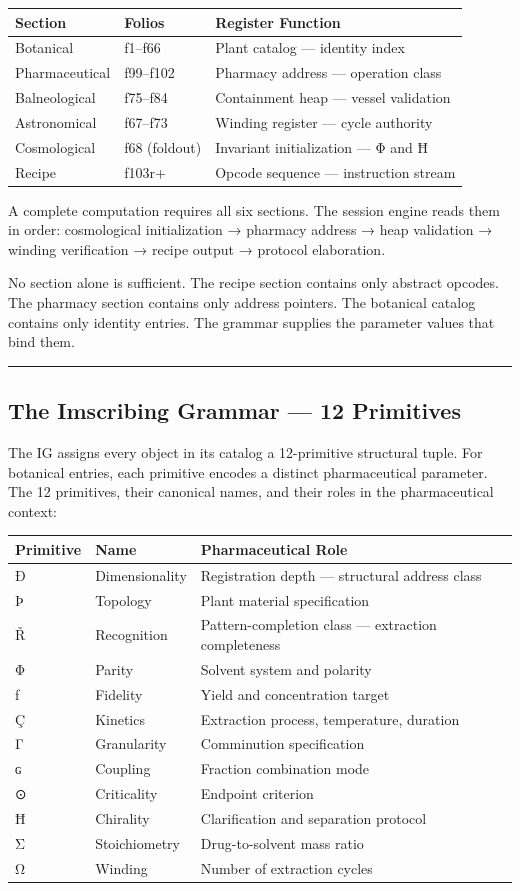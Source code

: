 \documentclass[12pt,a4paper]{article}
\begin{document}
\begin{longtable}[]{@{}lll@{}}
\toprule
Section & Folios & Register Function\tabularnewline
\midrule
\endhead
Botanical & f1--f66 & Plant catalog --- identity index\tabularnewline
Pharmaceutical & f99--f102 & Pharmacy address --- operation
class\tabularnewline
Balneological & f75--f84 & Containment heap --- vessel
validation\tabularnewline
Astronomical & f67--f73 & Winding register --- cycle
authority\tabularnewline
Cosmological & f68 (foldout) & Invariant initialization --- Φ and
Ħ\tabularnewline
Recipe & f103r+ & Opcode sequence --- instruction stream\tabularnewline
\bottomrule
\end{longtable}

A complete computation requires all six sections. The session engine
reads them in order: cosmological initialization → pharmacy address →
heap validation → winding verification → recipe output → protocol
elaboration.

No section alone is sufficient. The recipe section contains only
abstract opcodes. The pharmacy section contains only address pointers.
The botanical catalog contains only identity entries. The grammar
supplies the parameter values that bind them.

\begin{center}\rule{0.5\linewidth}{0.5pt}\end{center}

\hypertarget{the-imscribing-grammar-12-primitives}{%
\subsection{The Imscribing Grammar --- 12
Primitives}\label{the-imscribing-grammar-12-primitives}}

The IG assigns every object in its catalog a 12-primitive structural
tuple. For botanical entries, each primitive encodes a distinct
pharmaceutical parameter. The 12 primitives, their canonical names, and
their roles in the pharmaceutical context:

\begin{longtable}[]{@{}lll@{}}
\toprule
Primitive & Name & Pharmaceutical Role\tabularnewline
\midrule
\endhead
Ð & Dimensionality & Registration depth --- structural address
class\tabularnewline
Þ & Topology & Plant material specification\tabularnewline
Ř & Recognition & Pattern-completion class --- extraction
completeness\tabularnewline
Φ & Parity & Solvent system and polarity\tabularnewline
ƒ & Fidelity & Yield and concentration target\tabularnewline
Ç & Kinetics & Extraction process, temperature, duration\tabularnewline
Γ & Granularity & Comminution specification\tabularnewline
ɢ & Coupling & Fraction combination mode\tabularnewline
⊙ & Criticality & Endpoint criterion\tabularnewline
Ħ & Chirality & Clarification and separation protocol\tabularnewline
Σ & Stoichiometry & Drug-to-solvent mass ratio\tabularnewline
Ω & Winding & Number of extraction cycles\tabularnewline
\bottomrule
\end{longtable}
\end{document}
